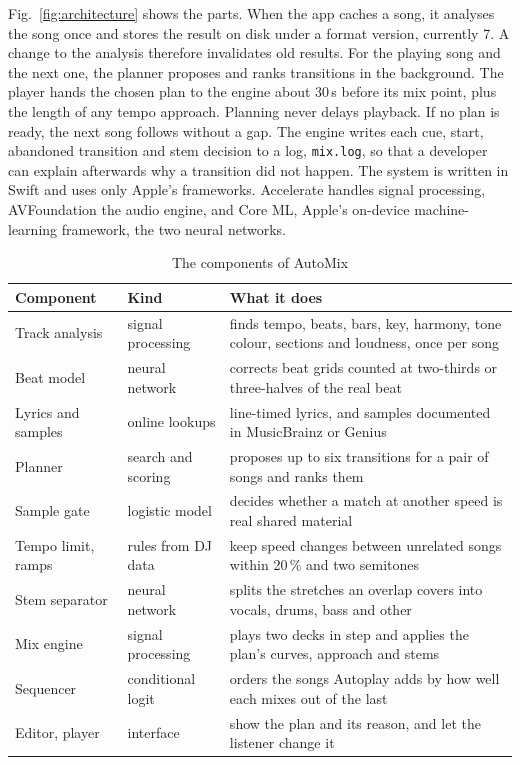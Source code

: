 \documentclass[conference,a4paper]{IEEEtran}
\newcommand{\code}[1]{\texttt{\small #1}}
\begin{document}
Fig.~\ref{fig:architecture} shows the parts. When the app caches a song, it analyses the song once
and stores the result on disk under a format version, currently 7. A change to the analysis
therefore invalidates old results. For the playing song and the next one, the planner proposes and
ranks transitions in the background. The player hands the chosen plan to the engine about 30\,s
before its mix point, plus the length of any tempo approach. Planning never delays playback. If no
plan is ready, the next song follows without a gap. The engine writes each cue, start, abandoned
transition and stem decision to a log, \code{mix.log}, so that a developer can explain afterwards
why a transition did not happen. The system is written in Swift and uses only Apple's frameworks.
Accelerate handles signal processing, AVFoundation the audio engine, and Core ML, Apple's on-device
machine-learning framework, the two neural networks.

\begin{table}[t]
\caption{The components of AutoMix}
\label{tab:components}
\centering\footnotesize
\begin{tabular}{@{}>{\raggedright\arraybackslash}p{1.75cm}>{\raggedright\arraybackslash}p{1.75cm}>{\raggedright\arraybackslash}p{4.3cm}@{}}
\toprule
Component & Kind & What it does\\
\midrule
Track analysis & signal processing & finds tempo, beats, bars, key, harmony, tone colour, sections and loudness, once per song\\
Beat model & neural network & corrects beat grids counted at two-thirds or three-halves of the real beat\\
Lyrics and samples & online lookups & line-timed lyrics, and samples documented in MusicBrainz or Genius\\
Planner & search and scoring & proposes up to six transitions for a pair of songs and ranks them\\
Sample gate & logistic model & decides whether a match at another speed is real shared material\\
Tempo limit, ramps & rules from DJ data & keep speed changes between unrelated songs within 20\,\% and two semitones\\
Stem separator & neural network & splits the stretches an overlap covers into vocals, drums, bass and other\\
Mix engine & signal processing & plays two decks in step and applies the plan's curves, approach and stems\\
Sequencer & conditional logit & orders the songs Autoplay adds by how well each mixes out of the last\\
Editor, player & interface & show the plan and its reason, and let the listener change it\\
\bottomrule
\end{tabular}
\end{table}
\end{document}
